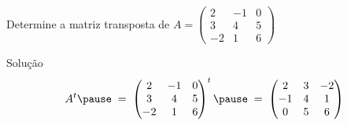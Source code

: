 \begin{question}
Determine a matriz transposta de
\(
  A =
  \begin{pmatrix}
    2  & -1 & 0 \\
    3  & 4  & 5 \\
    -2 & 1  & 6
  \end{pmatrix}
\)
\end{question}

\begin{resolution}{Solução}
  \[
    A^t
    \pause
    \;=\;
    \begin{pmatrix}
      2  & -1 & 0 \\
      3  & 4  & 5 \\
      -2 & 1  & 6
    \end{pmatrix}^t
    \pause
    \;=\;
    \begin{pmatrix}
      2  & 3 & -2 \\
      -1 & 4 & 1  \\
      0  & 5 & 6
    \end{pmatrix}
  \]
\end{resolution}


